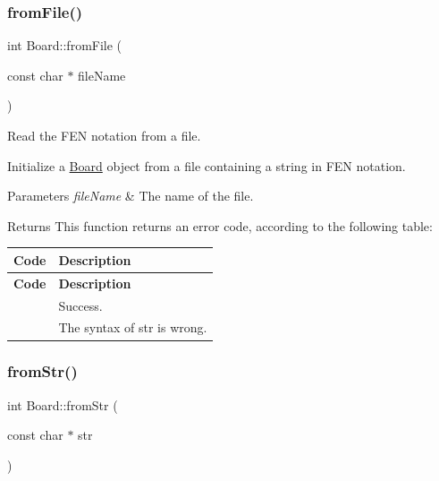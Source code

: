 \subsubsection{\texorpdfstring{from\+File()}{fromFile()}}
{\footnotesize\ttfamily int Board\+::from\+File (\begin{DoxyParamCaption}\item[{const char $\ast$}]{file\+Name }\end{DoxyParamCaption})\hspace{0.3cm}{\ttfamily [private]}}



Read the F\+EN notation from a file. 

Initialize a \hyperlink{classBoard}{Board} object from a file containing a string in F\+EN notation. 
\begin{DoxyParams}{Parameters}
{\em file\+Name} & The name of the file. \\
\hline
\end{DoxyParams}
\begin{DoxyReturn}{Returns}
This function returns an error code, according to the following table\+: \tabulinesep=1mm
\begin{longtabu} spread 0pt [c]{*{2}{|X[-1]}|}
\hline
\rowcolor{\tableheadbgcolor}\PBS\raggedleft \textbf{ Code }&\textbf{ Description  }\\
\endfirsthead
\hline
\endfoot
\hline
\rowcolor{\tableheadbgcolor}\PBS\raggedleft \textbf{ Code }&\textbf{ Description  }\\
\endhead
\PBS{} &Success. \\
\PBS{} &The syntax of str is wrong. \\
\end{longtabu}

\end{DoxyReturn}
\mbox{\label{classBoard_a49045c77d568e4b5a00f176a2add54c8}} 
\subsubsection{\texorpdfstring{from\+Str()}{fromStr()}}
{\footnotesize\ttfamily int Board\+::from\+Str (\begin{DoxyParamCaption}\item[{const char $\ast$}]{str }\end{DoxyParamCaption})\hspace{0.3cm}{\ttfamily [private]}}




